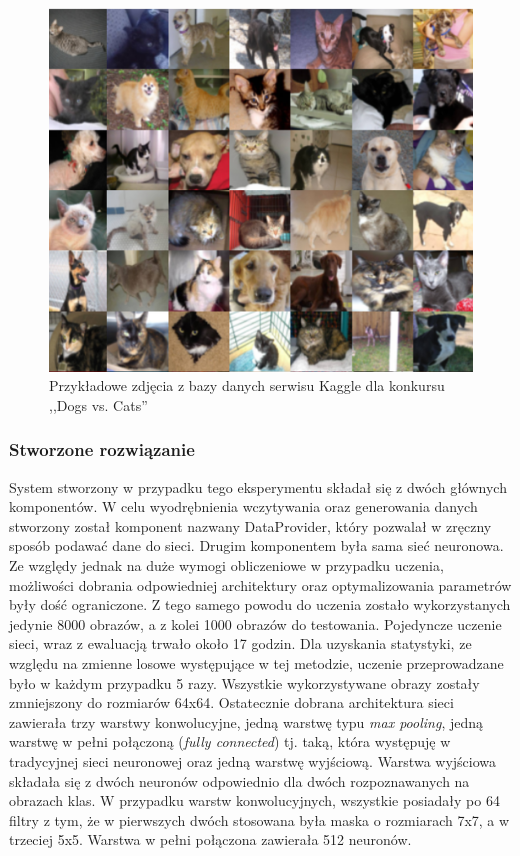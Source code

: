 \begin{figure}[ht!]
\centering
\includegraphics[scale=0.8]{res/catsdogs.png}
\caption[Caption for LOF]{Przykładowe zdjęcia z bazy danych serwisu Kaggle dla konkursu ,,Dogs vs. Cats'' \label{catsdogs}}
\end{figure} 

\subsubsection{Stworzone rozwiązanie}
System stworzony w przypadku tego eksperymentu składał się z dwóch głównych komponentów. W celu wyodrębnienia wczytywania oraz generowania danych stworzony został komponent nazwany DataProvider, który pozwalał w zręczny sposób podawać dane do sieci. Drugim komponentem była sama sieć neuronowa. Ze względy jednak na duże wymogi obliczeniowe w przypadku uczenia, możliwości dobrania odpowiedniej architektury oraz optymalizowania parametrów były dość ograniczone. Z tego samego powodu do uczenia zostało wykorzystanych jedynie 8000 obrazów, a z kolei 1000 obrazów do testowania. Pojedyncze uczenie sieci, wraz z ewaluacją trwało około 17 godzin. Dla uzyskania statystyki, ze względu na zmienne losowe występujące w tej metodzie, uczenie przeprowadzane było w każdym przypadku 5 razy. Wszystkie wykorzystywane obrazy zostały zmniejszony do rozmiarów 64x64. Ostatecznie dobrana architektura sieci zawierała trzy warstwy konwolucyjne, jedną warstwę typu \textit{max pooling}, jedną warstwę w pełni połączoną (\textit{fully connected}) tj. taką, która występuję w tradycyjnej sieci neuronowej oraz jedną warstwę wyjściową. Warstwa wyjściowa składała się z dwóch neuronów odpowiednio dla dwóch rozpoznawanych na obrazach klas. W przypadku warstw konwolucyjnych, wszystkie posiadały po 64 filtry z tym, że w pierwszych dwóch stosowana była maska o rozmiarach 7x7, a w trzeciej 5x5.  Warstwa w pełni połączona zawierała 512 neuronów.
